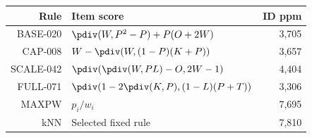\begin{tabular}{rlr}
\toprule
\textbf{Rule} & \textbf{Item score} & \textbf{ID ppm} \\
\midrule
BASE-020 & $\pdiv(W,P^2-P)+P(O+2W)$ & 3,705 \\
CAP-008 & $W-\pdiv(W,(1-P)(K+P))$ & 3,657 \\
SCALE-042 & $\pdiv(\pdiv(W,PL)-O,2W-1)$ & 4,404 \\
FULL-071 & $\pdiv(1-2\pdiv(K,P),(1-L)(P+T))$ & 3,306 \\
MAXPW & $p_i/w_i$ & 7,695 \\
kNN & Selected fixed rule & 7,810 \\
\bottomrule
\end{tabular}
